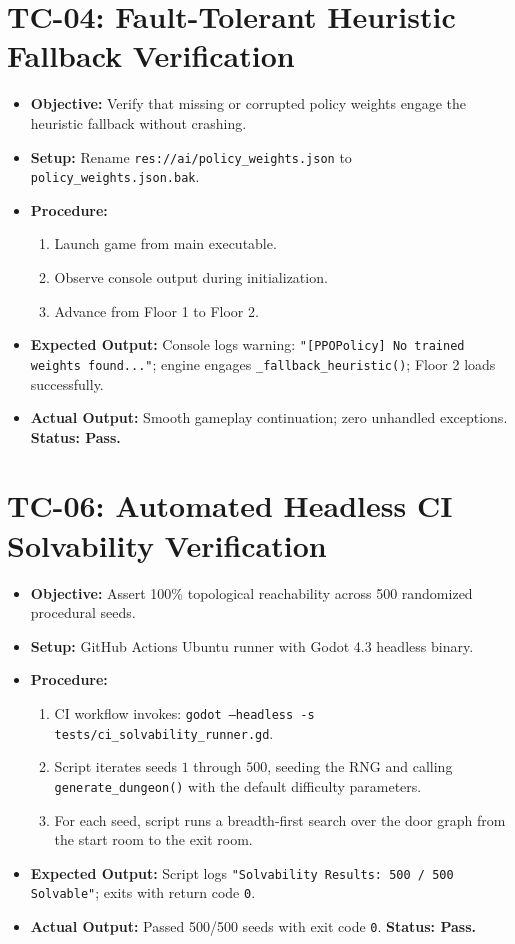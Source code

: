 \section{TC-04: Fault-Tolerant Heuristic Fallback Verification}
\begin{itemize}
    \item \textbf{Objective:} Verify that missing or corrupted policy weights engage the heuristic fallback without crashing.
    \item \textbf{Setup:} Rename \texttt{res://ai/\allowbreak policy\_\-weights.json} to \texttt{policy\_weights.json.bak}.
    \item \textbf{Procedure:}
    \begin{enumerate}
        \item Launch game from main executable.
        \item Observe console output during initialization.
        \item Advance from Floor 1 to Floor 2.
    \end{enumerate}
    \item \textbf{Expected Output:} Console logs warning: \texttt{"[PPOPolicy] No trained weights found..."}; engine engages \texttt{\_fallback\_heuristic()}; Floor 2 loads successfully.
    \item \textbf{Actual Output:} Smooth gameplay continuation; zero unhandled exceptions. \textbf{Status: Pass.}
\end{itemize}

\section{TC-06: Automated Headless CI Solvability Verification}
\begin{itemize}
    \item \textbf{Objective:} Assert 100\% topological reachability across 500 randomized procedural seeds.
    \item \textbf{Setup:} GitHub Actions Ubuntu runner with Godot 4.3 headless binary.
    \item \textbf{Procedure:}
    \begin{enumerate}
        \item CI workflow invokes: \texttt{godot --headless -s tests/ci\_solvability\_runner.gd}.
        \item Script iterates seeds $1$ through $500$, seeding the RNG and calling \texttt{generate\_dungeon()} with the default difficulty parameters.
        \item For each seed, script runs a breadth-first search over the door graph from the start room to the exit room.
    \end{enumerate}
    \item \textbf{Expected Output:} Script logs \texttt{"Solvability Results: 500 / 500 Solvable"}; exits with return code \texttt{0}.
    \item \textbf{Actual Output:} Passed 500/500 seeds with exit code \texttt{0}. \textbf{Status: Pass.}
\end{itemize}

